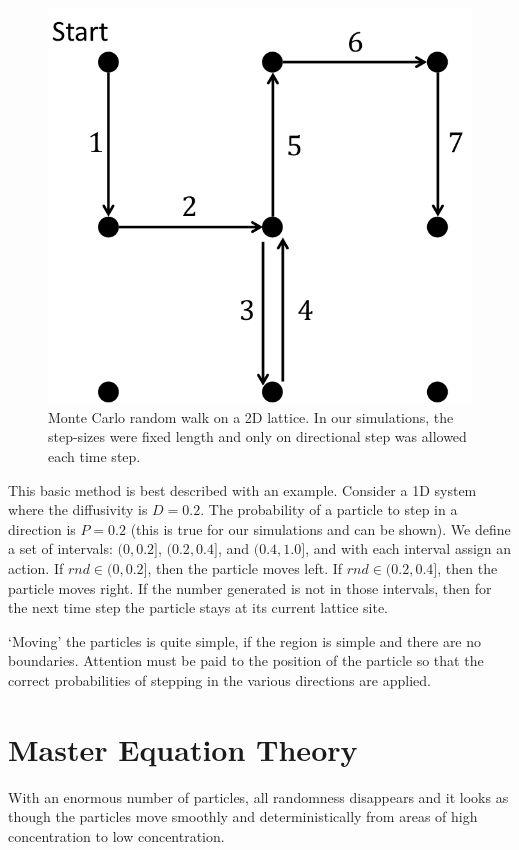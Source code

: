 	\begin{figure}[h]
		\centering
		\includegraphics[width=0.5\linewidth]{../images/mc-random-walk}
		\caption{Monte Carlo random walk on a 2D lattice. In our simulations, the step-sizes were fixed length and only on directional step was allowed each time step.}
		\label{fig:mc-random-walk}
	\end{figure}

	This basic method is best described with an example. Consider a 1D system where the diffusivity is $ D = 0.2 $. The probability of a particle to step in a direction is $ P = 0.2 $ (this is true for our simulations and can be shown). We define a set of intervals: $ (0,0.2] $, $ (0.2,0.4] $, and $ (0.4,1.0] $, and with each interval assign an action. If $ rnd \in (0,0.2] $, then the particle moves left. If $ rnd \in (0.2,0.4] $, then the particle moves right. If the number generated is not in those intervals, then for the next time step the particle stays at its current lattice site.
	
	`Moving' the particles is quite simple, if the region is simple and there are no boundaries. Attention must be paid to the position of the particle so that the correct probabilities of stepping in the various directions are applied.
	
\section{Master Equation Theory}
\label{sec:intro-me}
	With an enormous number of particles, all randomness disappears and it looks as though the particles move smoothly and deterministically from areas of high concentration to low concentration.
	
